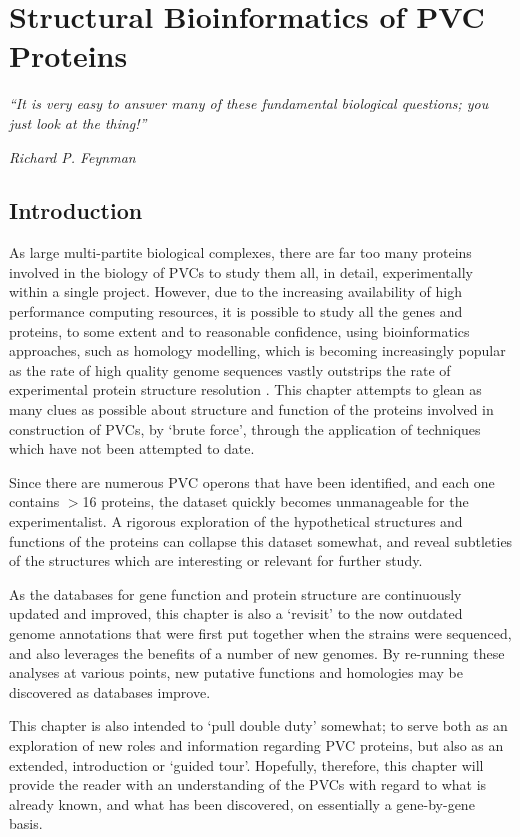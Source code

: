\chapter{Structural Bioinformatics of PVC Proteins}\label{structbioinfo}

\epigraph{\emph{``It is very easy to answer many of these fundamental biological questions; you just look at the thing!''}}{\textit{Richard P. Feynman}}

\section{Introduction}

As large multi-partite biological complexes, there are far too many proteins involved in the biology of PVCs to study them all, in detail, experimentally within a single project. However, due to the increasing availability of high performance computing resources, it is possible to study all the genes and proteins, to some extent and to reasonable confidence, using bioinformatics approaches, such as homology modelling, which is becoming increasingly popular as the rate of high quality genome sequences vastly outstrips the rate of experimental protein structure resolution \citep{Rodriguez1998}. This chapter attempts to glean as many clues as possible about structure and function of the proteins involved in construction of PVCs, by `brute force', through the application of techniques which have not been attempted to date.

Since there are numerous PVC operons that have been identified, and each one contains $>$16 proteins, the dataset quickly becomes unmanageable for the experimentalist. A rigorous exploration of the hypothetical structures and functions of the proteins can collapse this dataset somewhat, and reveal subtleties of the structures which are interesting or relevant for further study. 

As the databases for gene function and protein structure are continuously updated and improved, this chapter is also a `revisit' to the now outdated genome annotations that were first put together when the strains were sequenced, and also leverages the benefits of a number of new genomes. By re-running these analyses at various points, new putative functions and homologies may be discovered as databases improve.

This chapter is also intended to `pull double duty' somewhat; to serve both as an exploration of new roles and information regarding PVC proteins, but also as an extended, introduction or `guided tour'. Hopefully, therefore, this chapter will provide the reader with an understanding of the PVCs with regard to what is already known, and what has been discovered, on essentially a gene-by-gene basis.

